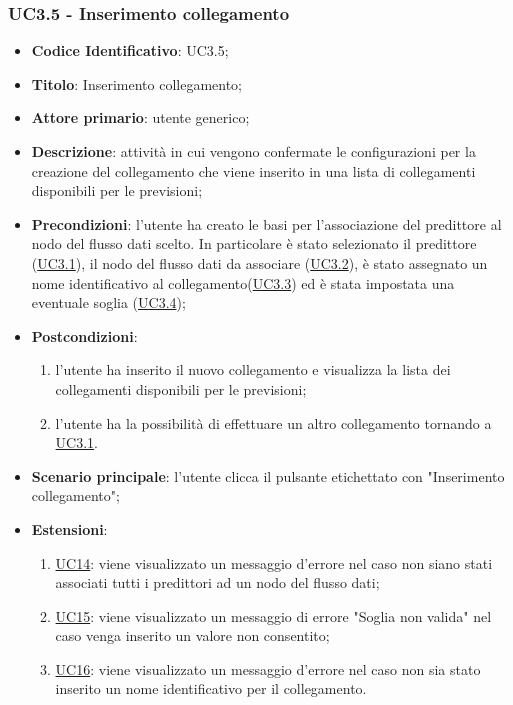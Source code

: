 	\label{par:UC3.5}
	\subsubsection{UC3.5 - Inserimento collegamento}
		\begin{itemize}
			\item\textbf{Codice Identificativo}: UC3.5;
			\item\textbf{Titolo}: Inserimento collegamento;
			\item\textbf{Attore primario}: utente generico;
			\item\textbf{Descrizione}: attività in cui vengono confermate le configurazioni per la creazione del collegamento che viene inserito in una lista di collegamenti disponibili per le previsioni;
			\item\textbf{Precondizioni}: l'utente ha creato le basi per l'associazione del predittore al nodo del flusso dati scelto. In particolare è stato selezionato il predittore (\hyperref[par:UC3.1]{UC3.1}), il nodo del flusso dati da associare (\hyperref[par:UC3.2]{UC3.2}), è stato assegnato un nome identificativo al collegamento(\hyperref[par:UC3.3]{UC3.3}) ed è stata impostata una eventuale soglia (\hyperref[par:UC3.4]{UC3.4});
			\item\textbf{Postcondizioni}:
				\begin{enumerate}
					\item l'utente ha inserito il nuovo collegamento e visualizza la lista dei collegamenti disponibili per le previsioni;
					\item l'utente ha la possibilità di effettuare un altro collegamento tornando a \hyperref[par:UC3.1]{UC3.1}.
				\end{enumerate}
			\item\textbf{Scenario principale}: l'utente clicca il pulsante etichettato con "Inserimento collegamento";
			\item\textbf{Estensioni}: 
				\begin{enumerate}
					\item\hyperref[par:UC14]{UC14}: viene visualizzato un messaggio d'errore nel caso non siano stati associati tutti i predittori ad un nodo del flusso dati;
					\item\hyperref[par:UC15]{UC15}: viene visualizzato un messaggio di errore "Soglia non valida" nel caso venga inserito un valore non consentito;			
					\item\hyperref[par:UC16]{UC16}: viene visualizzato un messaggio d'errore nel caso non sia stato inserito un nome identificativo per il collegamento.
					
				\end{enumerate}							
				
				
				
		\end{itemize}
		
